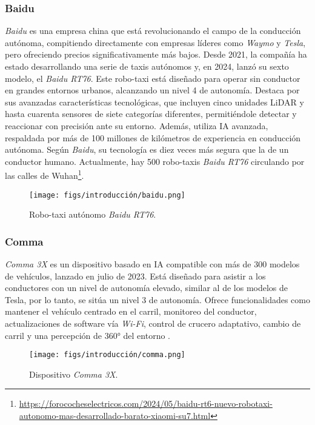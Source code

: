 \subsubsection{Baidu}

\textit{Baidu} es una empresa china que está revolucionando el campo de la conducción autónoma, compitiendo directamente con empresas líderes como \textit{Waymo} y \textit{Tesla}, pero ofreciendo precios significativamente más bajos. Desde 2021, la compañía ha estado desarrollando una serie de taxis autónomos y, en 2024, lanzó su sexto modelo, el \textit{Baidu RT76}. Este robo-taxi está diseñado para operar sin conductor en grandes entornos urbanos, alcanzando un nivel 4 de autonomía. Destaca por sus avanzadas características tecnológicas, que incluyen cinco unidades \ac{LiDAR} y hasta cuarenta sensores de siete categorías diferentes, permitiéndole detectar y reaccionar con precisión ante su entorno. Además, utiliza \ac{IA} avanzada, respaldada por más de 100 millones de kilómetros de experiencia en conducción autónoma. Según \textit{Baidu}, su tecnología es diez veces más segura que la de un conductor humano. Actualmente, hay 500 robo-taxis \textit{Baidu RT76} circulando por las calles de Wuhan\footnote{\url{https://forococheselectricos.com/2024/05/baidu-rt6-nuevo-robotaxi-autonomo-mas-desarrollado-barato-xiaomi-su7.html}}.

\begin{figure}[ht]
  \begin{center}
    \texttt{[image: figs/introducción/baidu.png]}
  \end{center}
  \caption{Robo-taxi autónomo \textit{Baidu RT76}.}
  \label{fig:baidu}
\end{figure}

\newpage

\subsubsection{Comma}

\textit{Comma 3X} es un dispositivo basado en \ac{IA} compatible con más de 300 modelos de vehículos, lanzado en julio de 2023. Está diseñado para asistir a los conductores con un nivel de autonomía elevado, similar al de los modelos de Tesla, por lo tanto, se sitúa un nivel 3 de autonomía. Ofrece funcionalidades como mantener el vehículo centrado en el carril, monitoreo del conductor, actualizaciones de software vía \textit{Wi-Fi}, control de crucero adaptativo, cambio de carril y una percepción de 360° del entorno \cite{comma}.
\begin{figure}[ht]
  \begin{center}
    \texttt{[image: figs/introducción/comma.png]}
  \end{center}
  \caption{Dispositivo \textit{Comma 3X}.}
  \label{fig:comma}
\end{figure}

